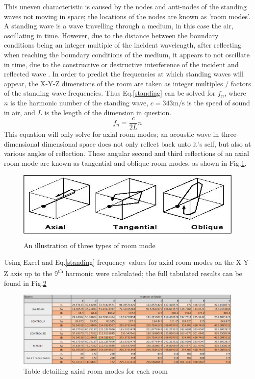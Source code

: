 \documentclass[10pt, twocolumn]{article}
\begin{document}
        This uneven characteristic is caused by the nodes and anti-nodes of the standing waves not moving in space; the locations of the nodes are known as 'room modes'.
        A standing wave is a wave travelling through a medium, in this case the air, oscillating in time.
        However, due to the distance between the boundary conditions being an integer multiple of the incident wavelength, after reflecting when reaching the boundary conditions of the medium, it appears to not oscillate in time, due to the constructive or destructive interference of the incident and reflected wave \cite{PHYS15}.
        In order to predict the frequencies at which standing waves will appear, the X-Y-Z dimensions of the room are taken as integer multiples / factors of the standing wave frequencies.
        Thus Eq.\ref{standing} can be solved for $f_n$, where $n$ is the harmonic number of the standing wave, $c=343\si{\meter\per\second}$ is the speed of sound in air, and $L$ is the length of the dimension in question.
        \begin{equation}\label{standing}
            f_n = \frac{c}{2L}n
        \end{equation}
        This equation will only solve for axial room modes; an acoustic wave in three-dimensional dimensional space does not only reflect back unto it's self, but also at various angles of reflection.
        These angular second and third reflections of an axial room mode are known as tangential and oblique room modes, as shown in Fig.\ref{oblique}.
        \begin{figure}[H]
            \centering
            \includegraphics[scale=0.375]{resources/oblique.jpg}
            \caption{An illustration of three types of room mode \cite{MODES}}
            \label{oblique}
        \end{figure}
        Using Excel and Eq.\ref{standing} frequency values for axial room modes on the X-Y-Z axis up to the 9\textsuperscript{th} harmonic were calculated; the full tabulated results can be found in Fig.\ref{modes}
        \begin{figure}[ht]
            \centering
            \includegraphics[scale=0.6]{resources/modes.png}
            \caption{Table detailing axial room modes for each room}
            \label{modes}
        \end{figure}
\end{document}

